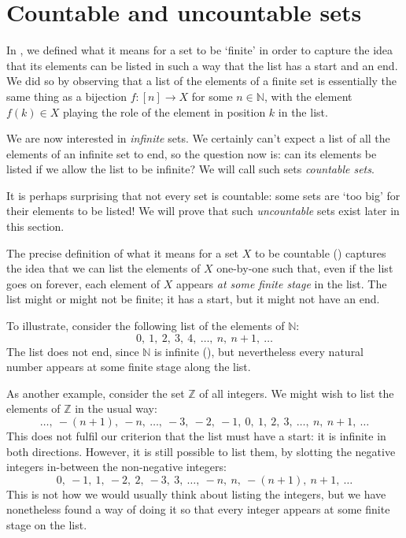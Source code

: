 \section{Countable and uncountable sets}

In , we defined what it means for a set to be `finite' in order to capture the idea that its elements can be listed in such a way that the list has a start and an end. We did so by observing that a list of the elements of a finite set is essentially the same thing as a bijection $f : [n] \to X$ for some $n \in \mathbb{N}$, with the element $f(k) \in X$ playing the role of the element in position $k$ in the list.

We are now interested in \textit{infinite} sets. We certainly can't expect a list of all the elements of an infinite set to end, so the question now is: can its elements be listed if we allow the list to be infinite? We will call such sets \textit{countable sets}.

It is perhaps surprising that not every set is countable: some sets are `too big' for their elements to be listed! We will prove that such \textit{uncountable} sets exist later in this section.

The precise definition of what it means for a set $X$ to be countable () captures the idea that we can list the elements of $X$ one-by-one such that, even if the list goes on forever, each element of $X$ appears \textit{at some finite stage} in the list. The list might or might not be finite; it has a start, but it might not have an end.

To illustrate, consider the following list of the elements of $\mathbb{N}$:
\[ 0,~ 1,~ 2,~ 3,~ 4,~ \dots,~ n,~ n+1,~ \dots \]
The list does not end, since $\mathbb{N}$ is infinite (), but nevertheless every natural number appears at some finite stage along the list.

As another example, consider the set $\mathbb{Z}$ of all integers. We might wish to list the elements of $\mathbb{Z}$ in the usual way:
\[ \dots,~ -(n+1),~ -n,~ \dots,~ -3,~ -2,~ -1,~ 0,~ 1,~ 2,~ 3,~ \dots,~ n,~ n+1,~ \dots \]
This does not fulfil our criterion that the list must have a start: it is infinite in both directions. However, it is still possible to list them, by slotting the negative integers in-between the non-negative integers:
\[ 0,~ -1,~ 1,~ -2,~ 2,~ -3,~ 3,~ \dots,~ -n,~ n,~ -(n+1),~ n+1,~ \dots\]
This is not how we would usually think about listing the integers, but we have nonetheless found a way of doing it so that every integer appears at some finite stage on the list.

